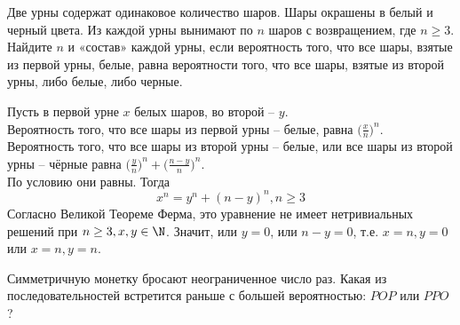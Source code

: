 \begin{problem}[ВТФ]
    Две урны содержат одинаковое количество шаров. Шары окрашены в белый и черный цвета. Из каждой урны вынимают по $n$ шаров с возвращением, где $n \geq 3$. Найдите $n$ и «состав» каждой урны, если вероятность того, что все шары, взятые из первой урны, белые, равна вероятности того, что все шары, взятые из второй урны, либо белые, либо черные.
\end{problem}
\begin{solution}
    Пусть в первой урне $x$ белых шаров, во второй -- $y$. \\
    Вероятность того, что все шары из первой урны -- белые, равна $\bigg(\frac{x}{n}\bigg)^n$. \\
    Вероятность того, что все шары из второй урны -- белые, или все шары из второй урны -- чёрные равна $\bigg(\frac{y}{n}\bigg)^n + \bigg(\frac{n - y}{n}\bigg)^n$. \\
    По условию они равны. Тогда \[
                                    x^n = y^n + (n - y)^n, n \geq 3
    \]
    Согласно Великой Теореме Ферма, это уравнение не имеет нетривиальных решений при $n \geq 3, x, y \in \N$. Значит, или $y = 0$, или $n - y = 0$, т.е. $x = n, y = 0$ или $x = n, y = n$.
\end{solution}
\begin{problem}
    Симметричную монетку бросают неограниченное число раз. Какая из последовательностей встретится раньше с большей вероятностью: $POP$ или $PPO$?
\end{problem}
